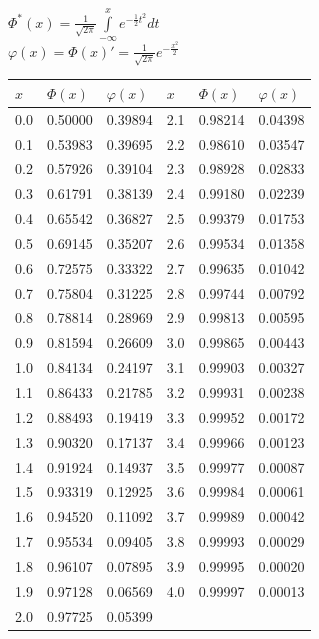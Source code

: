 \documentclass[russian, 12pt, fleqn]{article}
\begin{document}
\newpage
\noindent
\begin{center}
$\Phi^*(x) = \frac{1}{\sqrt{2\pi} } \displaystyle{\int \limits_{-\infty}^{x}} e^{-\frac{1}{2}t^2} dt$\\
$\varphi(x) = \Phi(x)' = \frac{1}{\sqrt{2\pi} } e^{-\frac{x^2}{2}}$\\

\begin{tabular}[b]{ | l | l |  l || l | l |  l |}
\hline
$x$&$\Phi(x)$&$\varphi(x)$&$x$&$\Phi(x)$&$\varphi(x)$\\
\hline
0.0&0.50000&0.39894&2.1&0.98214&0.04398\\%
0.1&0.53983&0.39695&2.2&0.98610&0.03547\\%
0.2&0.57926&0.39104&2.3&0.98928&0.02833\\%
0.3&0.61791&0.38139&2.4&0.99180&0.02239\\%
0.4&0.65542&0.36827&2.5&0.99379&0.01753\\%
0.5&0.69145&0.35207&2.6&0.99534&0.01358\\%
0.6&0.72575&0.33322&2.7&0.99635&0.01042\\%
0.7&0.75804&0.31225&2.8&0.99744&0.00792\\%
0.8&0.78814&0.28969&2.9&0.99813&0.00595\\%
0.9&0.81594&0.26609&3.0&0.99865&0.00443\\%
1.0&0.84134&0.24197&3.1&0.99903&0.00327\\%
1.1&0.86433&0.21785&3.2&0.99931&0.00238\\%
1.2&0.88493&0.19419&3.3&0.99952&0.00172\\%
1.3&0.90320&0.17137&3.4&0.99966&0.00123\\%
1.4&0.91924&0.14937&3.5&0.99977&0.00087\\%
1.5&0.93319&0.12925&3.6&0.99984&0.00061\\%
1.6&0.94520&0.11092&3.7&0.99989&0.00042\\%
1.7&0.95534&0.09405&3.8&0.99993&0.00029\\%
1.8&0.96107&0.07895&3.9&0.99995&0.00020\\%
1.9&0.97128&0.06569&4.0&0.99997&0.00013\\%
2.0&0.97725&0.05399&     &              &             \\
\hline

\end{tabular}

\end{center}
\end{document}
